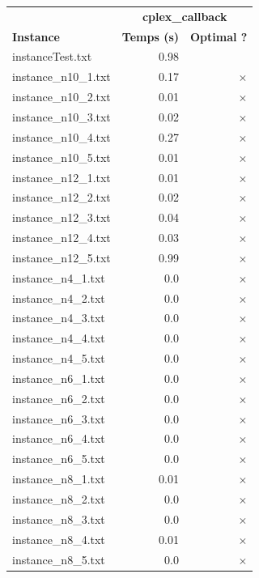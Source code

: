 \documentclass{article}
\begin{document}
\begin{center}
\renewcommand{\arraystretch}{1.4}
 \begin{tabular}{lrr}
	\hline
 & \multicolumn{2}{c}{\textbf{cplex_callback}}\\
\textbf{Instance}  & \textbf{Temps (s)} & \textbf{Optimal ?} \\\hline

instanceTest.txt & 0.98 & 
\\
instance\_n10\_1.txt & 0.17 & 
$\times$
\\
instance\_n10\_2.txt & 0.01 & 
$\times$
\\
instance\_n10\_3.txt & 0.02 & 
$\times$
\\
instance\_n10\_4.txt & 0.27 & 
$\times$
\\
instance\_n10\_5.txt & 0.01 & 
$\times$
\\
instance\_n12\_1.txt & 0.01 & 
$\times$
\\
instance\_n12\_2.txt & 0.02 & 
$\times$
\\
instance\_n12\_3.txt & 0.04 & 
$\times$
\\
instance\_n12\_4.txt & 0.03 & 
$\times$
\\
instance\_n12\_5.txt & 0.99 & 
$\times$
\\
instance\_n4\_1.txt & 0.0 & 
$\times$
\\
instance\_n4\_2.txt & 0.0 & 
$\times$
\\
instance\_n4\_3.txt & 0.0 & 
$\times$
\\
instance\_n4\_4.txt & 0.0 & 
$\times$
\\
instance\_n4\_5.txt & 0.0 & 
$\times$
\\
instance\_n6\_1.txt & 0.0 & 
$\times$
\\
instance\_n6\_2.txt & 0.0 & 
$\times$
\\
instance\_n6\_3.txt & 0.0 & 
$\times$
\\
instance\_n6\_4.txt & 0.0 & 
$\times$
\\
instance\_n6\_5.txt & 0.0 & 
$\times$
\\
instance\_n8\_1.txt & 0.01 & 
$\times$
\\
instance\_n8\_2.txt & 0.0 & 
$\times$
\\
instance\_n8\_3.txt & 0.0 & 
$\times$
\\
instance\_n8\_4.txt & 0.01 & 
$\times$
\\
instance\_n8\_5.txt & 0.0 & 
$\times$
\\
\hline\end{tabular}
\end{center}
\end{document}

